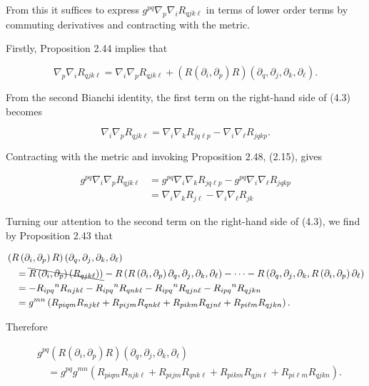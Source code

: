 \documentclass[10pt, letterpaper]{article}
\begin{document}
From this it suffices to express $g^{p q} \nabla_{p} \nabla_{i} R_{q j k \ell}$ in terms of lower order terms by commuting derivatives and contracting with the metric.

Firstly, Proposition 2.44 implies that

$$
\nabla_{p} \nabla_{i} R_{q j k \ell}=\nabla_{i} \nabla_{p} R_{q j k \ell}+\left(R\left(\partial_{i}, \partial_{p}\right) R\right)\left(\partial_{q}, \partial_{j}, \partial_{k}, \partial_{\ell}\right) .
$$

From the second Bianchi identity, the first term on the right-hand side of (4.3) becomes

$$
\nabla_{i} \nabla_{p} R_{q j k \ell}=\nabla_{i} \nabla_{k} R_{j q \ell p}-\nabla_{i} \nabla_{\ell} R_{j q k p} .
$$

Contracting with the metric and invoking Proposition 2.48, (2.15), gives

$$
\begin{aligned}
g^{p q} \nabla_{i} \nabla_{p} R_{q j k \ell} & =g^{p q} \nabla_{i} \nabla_{k} R_{j q \ell p}-g^{p q} \nabla_{i} \nabla_{\ell} R_{j q k p} \\
& =\nabla_{i} \nabla_{k} R_{j \ell}-\nabla_{i} \nabla_{\ell} R_{j k}
\end{aligned}
$$

Turning our attention to the second term on the right-hand side of (4.3), we find by Proposition 2.43 that

$$
\begin{aligned}
& \left(R\left(\partial_{i}, \partial_{p}\right) R\right)\left(\partial_{q}, \partial_{j}, \partial_{k}, \partial_{\ell}\right) \\
& \quad=\bcancel{R\left(\partial_{i}, \partial_{p}\right)\left(R_{q j k \ell}\right))}-R\left(R\left(\partial_{i}, \partial_{p}\right) \partial_{q}, \partial_{j}, \partial_{k}, \partial_{\ell}\right)-\cdots-R\left(\partial_{q}, \partial_{j}, \partial_{k}, R\left(\partial_{i}, \partial_{p}\right) \partial_{\ell}\right) \\
& \quad=-R_{i p q}{ }^{n} R_{n j k \ell}-R_{i p q}{ }^{n} R_{q n k \ell}-R_{i p q}{ }^{n} R_{q j n \ell}-R_{i p q}{ }^{n} R_{q j k n} \\
& \quad=g^{m n}\left(R_{p i q m} R_{n j k \ell}+R_{p i j m} R_{q n k \ell}+R_{p i k m} R_{q j n \ell}+R_{p i \ell m} R_{q j k n}\right) .
\end{aligned}
$$

Therefore

$$
\begin{aligned}
& g^{p q}\left(R\left(\partial_{i}, \partial_{p}\right) R\right)\left(\partial_{q}, \partial_{j}, \partial_{k}, \partial_{\ell}\right) \\
& \quad=g^{p q} g^{m n}\left(R_{p i q m} R_{n j k \ell}+R_{p i j m} R_{q n k \ell}+R_{p i k m} R_{q j n \ell}+R_{p i \ell m} R_{q j k n}\right) .
\end{aligned}
$$
\end{document}
